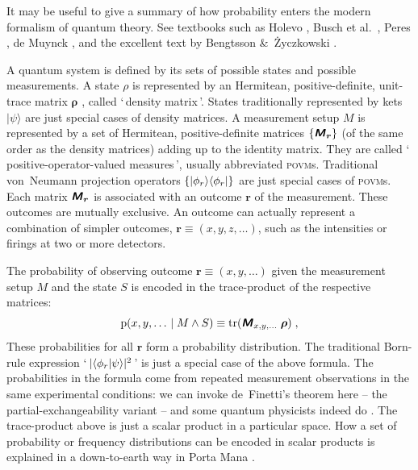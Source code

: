 \documentclass[\ifafour a4paper,12pt,\else a5paper,10pt,\fi%
onecolumn,oneside,article,%
british%
]{memoir}
\newcommand*{\defquote}[1]{`\,#1\,'}
\theoremstyle{remark}
\theoremstyle{innote}
\newcommand*{\mathte}[1]{\textbf{\textit{\textsf{#1}}}}
\newcommand*{\citep}{\parencites}%
\newcommand*{\citey}{\parencites*}
\newcommand*{\amp}{\&}
\DeclareMathOperator{\tr}{tr}%
\DeclarePairedDelimiter\abs{\lvert}{\rvert}
\DeclarePairedDelimiter\set{\{}{\}}
\newcommand*{\pf}{\mathrm{p}}%
\renewcommand*{\|}[1][]{\nonscript\,#1\vert\nonscript\;\mathopen{}}
\newcommand*{\chap}{ch.}%
\newcommand*{\etal}{{et al.}}
\newcommand*{\yr}{\bm{\rho}}
\newcommand*{\yM}{\mathte{M}}
\newcommand*{\povm}{\textsc{povm}}
\newcommand*{\ybr}{\bm{r}}
\begin{document}
It may be useful to give a summary of how probability enters the modern
formalism of quantum theory. See textbooks such as Holevo
\citey{holevo1980_t2011}, Busch \etal\ \citey{buschetal1995b}, Peres
\citey[especially \chap~12]{peres1993_r2002}, de Muynck \citey[especially
\chap~3]{demuynck2002b_2004}, and the excellent text by Bengtsson \amp\
\.Zyczkowski \citey{bengtssonetal2006_r2017}.

A quantum system is defined by its sets of possible states and possible
measurements. A state $\rho$ is represented by an Hermitean,
positive-definite, unit-trace matrix $\yr$ \citep[which satisfies
additional mathematical
properties:][]{jakobczyketal2001,kimura2003,kimuraetal2004,bengtssonetal2006_r2017},
called \defquote{density matrix}. States traditionally represented by kets
$\lvert \psi \rangle$ are just special cases of density matrices. A
measurement setup $M$ is represented by a set of Hermitean,
positive-definite matrices $\set{\yM_{\ybr}}$ (of the same order as the
density matrices) adding up to the identity matrix. They are called
\defquote{positive-operator-valued measures}, usually abbreviated \povm s.
Traditional von~Neumann projection operators
$\set{\lvert \phi_{r} \rangle\langle \phi_{r}\rvert}$ are just special
cases of \povm s. Each matrix $\yM_{\ybr}$ is associated with an outcome
$\ybr$ of the measurement. These outcomes are mutually exclusive. An
outcome can actually represent a combination of simpler outcomes,
$\ybr\equiv(x,y,z,\dotsc)$, such as the intensities or firings at two or
more detectors.

The probability of observing outcome $\ybr\equiv (x, y, \dotsc)$ given
the measurement setup $M$ and the state $S$ is encoded in the trace-product
of the respective matrices:
\begin{equation}
  \label{eq:povm_trace}
  \pf(x,y,\dotsc \| M \land S) \equiv \tr(\yM_{x,y,\dotsc}\;\yr) \;,
\end{equation}
These probabilities for all $\ybr$ form a probability distribution. The
traditional Born-rule expression
\defquote{$\abs{\langle \phi_{r} \vert \psi \rangle}^{2}$} is just a
special case of the above formula. The probabilities in the formula come
from repeated measurement observations in the same experimental conditions:
we can invoke de~Finetti's \citey{definetti1937,definetti1938} theorem here
-- the partial-exchangeability variant -- and some quantum physicists
indeed do \citep{cavesetal2002,vanenketal2002,fuchsetal2004b}. The
trace-product above is just a scalar product in a particular space. How a
set of probability or frequency distributions can be encoded in scalar
products is explained in a down-to-earth way in Porta Mana
\citey{portamana2003b,portamana2004b}.
\end{document}
